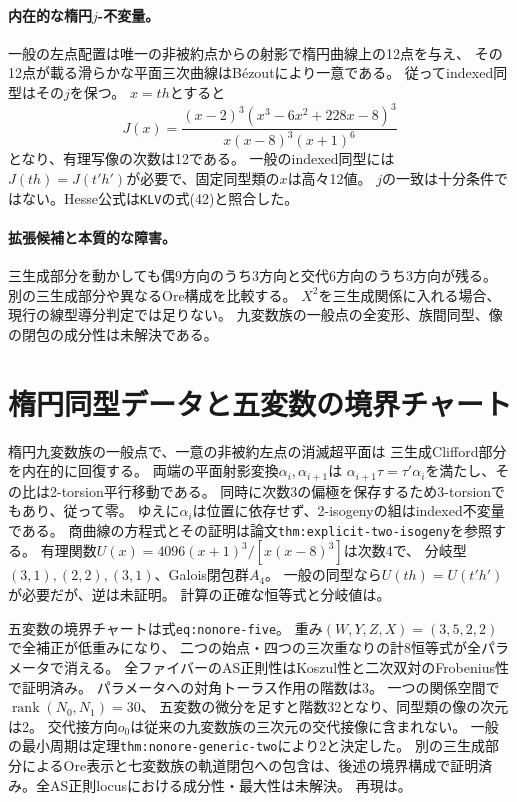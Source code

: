 \documentclass[11pt,a4paper]{ltjsarticle}
\begin{document}
\paragraph{内在的な楕円$j$-不変量。}
一般の左点配置は唯一の非被約点からの射影で楕円曲線上の12点を与え、
その12点が載る滑らかな平面三次曲線はB\'ezoutにより一意である。
従ってindexed同型はその$j$を保つ。
$x=th$とすると
\[
 J(x)=\frac{(x-2)^3(x^3-6x^2+228x-8)^3}{x(x-8)^3(x+1)^6}
\]
となり、有理写像の次数は12である。
一般のindexed同型には$J(th)=J(t'h')$が必要で、固定同型類の$x$は高々12値。
$j$の一致は十分条件ではない。Hesse公式は\texttt{KLV}の式(42)と照合した。

\paragraph{拡張候補と本質的な障害。}
三生成部分を動かしても偶9方向のうち3方向と交代6方向のうち3方向が残る。
別の三生成部分や異なるOre構成を比較する。
$X^2$を三生成関係に入れる場合、現行の線型導分判定では足りない。
九変数族の一般点の全変形、族間同型、像の閉包の成分性は未解決である。

\section{楕円同型データと五変数の境界チャート}
楕円九変数族の一般点で、一意の非被約左点の消滅超平面は
三生成Clifford部分を内在的に回復する。
両端の平面射影変換$\alpha_i,\alpha_{i+1}$は
$\alpha_{i+1}\tau=\tau'\alpha_i$を満たし、その比は2-torsion平行移動である。
同時に次数3の偏極を保存するため3-torsionでもあり、従って零。
ゆえに$\alpha_i$は位置に依存せず、2-isogenyの組はindexed不変量である。
商曲線の方程式とその証明は論文\texttt{thm:explicit-two-isogeny}を参照する。
有理関数$U(x)=4096(x+1)^3/[x(x-8)^3]$は次数4で、
分岐型$(3,1),(2,2),(3,1)$、Galois閉包群$A_4$。
一般の同型なら$U(th)=U(t'h')$が必要だが、逆は未証明。
計算の正確な恒等式と分岐値は。

五変数の境界チャートは式\texttt{eq:nonore-five}。
重み$(W,Y,Z,X)=(3,5,2,2)$で全補正が低重みになり、
二つの始点・四つの三次重なりの計8恒等式が全パラメータで消える。
全ファイバーのAS正則性はKoszul性と二次双対のFrobenius性で証明済み。
パラメータへの対角トーラス作用の階数は3。
一つの関係空間で$\operatorname{rank}(N_0,N_1)=30$、
五変数の微分を足すと階数32となり、同型類の像の次元は2。
交代接方向$o_0$は従来の九変数族の三次元の交代接像に含まれない。
一般の最小周期は定理\texttt{thm:nonore-generic-two}により2と決定した。
別の三生成部分によるOre表示と七変数族の軌道閉包への包含は、後述の境界構成で証明済み。全AS正則locusにおける成分性・最大性は未解決。
再現は。
\end{document}

